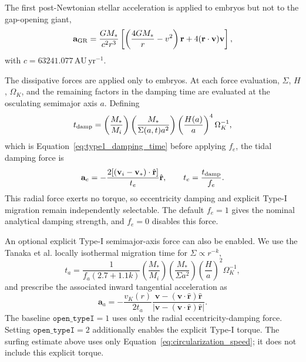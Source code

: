 The first post-Newtonian stellar acceleration is applied to embryos but not
to the gap-opening giant,
\begin{equation}
    \mathbf a_{\rm GR}
    =\frac{GM_*}{c^2r^3}
    \left[\left(\frac{4GM_*}{r}-v^2\right)\mathbf r
    +4(\mathbf r\mathbin{\cdot}\mathbf v)\mathbf v\right],
\label{eq:numerical_gr_force}
\end{equation}
with $c=63241.077\,\mathrm{AU\,yr^{-1}}$.

The dissipative forces are applied only to embryos. At each force
evaluation, $\Sigma$, $H$, $\Omega_K$, and the remaining factors in the
damping time are evaluated at the osculating semimajor axis $a$. Defining
\begin{equation}
    t_{\rm damp}=\left(\frac{M_*}{M_i}\right)
    \left(\frac{M_*}{\Sigma(a,t)a^2}\right)
    \left(\frac{H(a)}{a}\right)^4\Omega_K^{-1},
\label{eq:numerical_damping_time}
\end{equation}
which is Equation~\ref{eq:type1_damping_time} before applying $f_e$, the
tidal damping force is
\begin{equation}
    \mathbf a_e=-\frac{2[(\mathbf v_i-\mathbf v_*)\mathbin{\cdot}
    \hat{\mathbf r}]}{t_e}\hat{\mathbf r},
    \qquad t_e=\frac{t_{\rm damp}}{f_e}.
\label{eq:numerical_eccentricity_force}
\end{equation}
This radial force exerts no torque, so eccentricity damping and explicit
Type-I migration remain independently selectable.
The default $f_e=1$ gives the nominal analytical damping strength, and
$f_e=0$ disables this force.

An optional explicit Type-I semimajor-axis force can also be enabled. We
use the Tanaka et al. locally isothermal migration time for
$\Sigma\propto r^{-k}$,
\begin{equation}
    t_a=\frac{1}{f_a(2.7+1.1k)}
    \left(\frac{M_*}{M_i}\right)
    \left(\frac{M_*}{\Sigma a^2}\right)
    \left(\frac{H}{a}\right)^2\Omega_K^{-1},
\label{eq:numerical_migration_time}
\end{equation}
and prescribe the associated inward tangential acceleration as
\begin{equation}
    \mathbf a_a=-\frac{v_K(r)}{2t_a}
    \frac{\mathbf v-(\mathbf v\mathbin{\cdot}\hat{\mathbf r})
    \hat{\mathbf r}}
    {|\mathbf v-(\mathbf v\mathbin{\cdot}\hat{\mathbf r})
    \hat{\mathbf r}|}.
\label{eq:numerical_migration_force}
\end{equation}
The baseline $\mathtt{open\_typeI}=1$ uses only the radial eccentricity-damping
force. Setting $\mathtt{open\_typeI}=2$ additionally enables the explicit
Type-I torque. The surfing estimate above uses only
Equation~\ref{eq:circularization_speed}; it does not include this explicit
torque.

